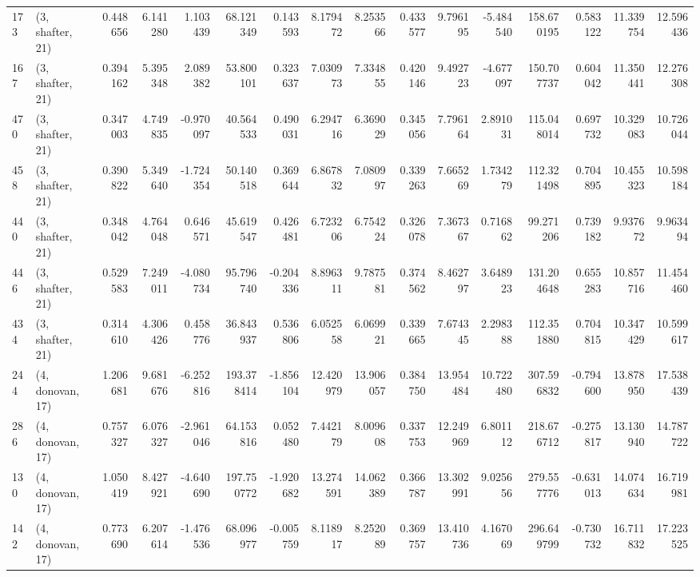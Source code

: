 \begin{tabular}{llrrrrrrrrrrrrrr}
173 &  (3, shafter, 21) &   0.448656 &   6.141280 &   1.103439 &    68.121349 &   0.143593 &   8.179472 &   8.253566 &  0.433577 &   9.796195 &  -5.484540 &   158.670195 &  0.583122 &  11.339754 &  12.596436 \\
167 &  (3, shafter, 21) &   0.394162 &   5.395348 &   2.089382 &    53.800101 &   0.323637 &   7.030973 &   7.334855 &  0.420146 &   9.492723 &  -4.677097 &   150.707737 &  0.604042 &  11.350441 &  12.276308 \\
470 &  (3, shafter, 21) &   0.347003 &   4.749835 &  -0.970097 &    40.564533 &   0.490031 &   6.294716 &   6.369029 &  0.345056 &   7.796164 &   2.891031 &   115.048014 &  0.697732 &  10.329083 &  10.726044 \\
458 &  (3, shafter, 21) &   0.390822 &   5.349640 &  -1.724354 &    50.140518 &   0.369644 &   6.867832 &   7.080997 &  0.339263 &   7.665269 &   1.734279 &   112.321498 &  0.704895 &  10.455323 &  10.598184 \\
440 &  (3, shafter, 21) &   0.348042 &   4.764048 &   0.646571 &    45.619547 &   0.426481 &   6.723206 &   6.754224 &  0.326078 &   7.367367 &   0.716862 &    99.271206 &  0.739182 &   9.937672 &   9.963494 \\
446 &  (3, shafter, 21) &   0.529583 &   7.249011 &  -4.080734 &    95.796740 &  -0.204336 &   8.896311 &   9.787581 &  0.374562 &   8.462797 &   3.648923 &   131.204648 &  0.655283 &  10.857716 &  11.454460 \\
434 &  (3, shafter, 21) &   0.314610 &   4.306426 &   0.458776 &    36.843937 &   0.536806 &   6.052558 &   6.069921 &  0.339665 &   7.674345 &   2.298388 &   112.351880 &  0.704815 &  10.347429 &  10.599617 \\
244 &  (4, donovan, 17) &   1.206681 &   9.681676 &  -6.252816 &   193.378414 &  -1.856104 &  12.420979 &  13.906057 &  0.384750 &  13.954484 &  10.722480 &   307.596832 & -0.794600 &  13.878950 &  17.538439 \\
286 &  (4, donovan, 17) &   0.757327 &   6.076327 &  -2.961046 &    64.153816 &   0.052480 &   7.442179 &   8.009608 &  0.337753 &  12.249969 &   6.801112 &   218.676712 & -0.275817 &  13.130940 &  14.787722 \\
130 &  (4, donovan, 17) &   1.050419 &   8.427921 &  -4.640690 &   197.750772 &  -1.920682 &  13.274591 &  14.062389 &  0.366787 &  13.302991 &   9.025656 &   279.557776 & -0.631013 &  14.074634 &  16.719981 \\
142 &  (4, donovan, 17) &   0.773690 &   6.207614 &  -1.476536 &    68.096977 &  -0.005759 &   8.118917 &   8.252089 &  0.369757 &  13.410736 &   4.167069 &   296.649799 & -0.730732 &  16.711832 &  17.223525 \\

\end{tabular}
